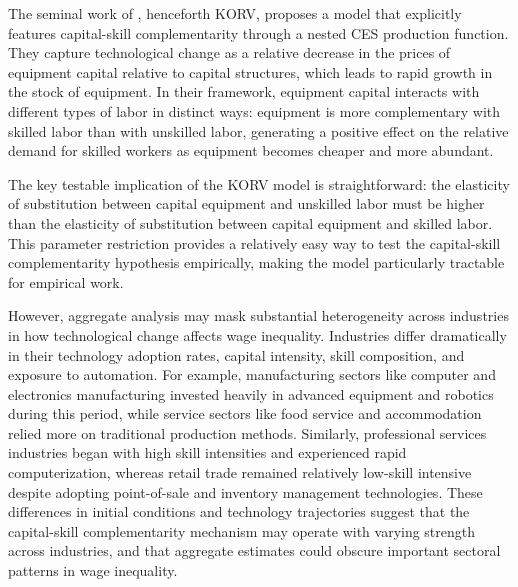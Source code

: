 \documentclass[12pt]{article}
\begin{document}
The seminal work of \citet{krusell2000capital}, henceforth KORV, proposes a model that explicitly features capital-skill complementarity through a nested CES production function. They capture technological change as a relative decrease in the prices of equipment capital relative to capital structures, which leads to rapid growth in the stock of equipment. In their framework, equipment capital interacts with different types of labor in distinct ways: equipment is more complementary with skilled labor than with unskilled labor, generating a positive effect on the relative demand for skilled workers as equipment becomes cheaper and more abundant.

The key testable implication of the KORV model is straightforward: the elasticity of substitution between capital equipment and unskilled labor must be higher than the elasticity of substitution between capital equipment and skilled labor. This parameter restriction provides a relatively easy way to test the capital-skill complementarity hypothesis empirically, making the model particularly tractable for empirical work.

However, aggregate analysis may mask substantial heterogeneity across industries in how technological change affects wage inequality. Industries differ dramatically in their technology adoption rates, capital intensity, skill composition, and exposure to automation. For example, manufacturing sectors like computer and electronics manufacturing invested heavily in advanced equipment and robotics during this period, while service sectors like food service and accommodation relied more on traditional production methods. Similarly, professional services industries began with high skill intensities and experienced rapid computerization, whereas retail trade remained relatively low-skill intensive despite adopting point-of-sale and inventory management technologies. These differences in initial conditions and technology trajectories suggest that the capital-skill complementarity mechanism may operate with varying strength across industries, and that aggregate estimates could obscure important sectoral patterns in wage inequality.
\end{document}
